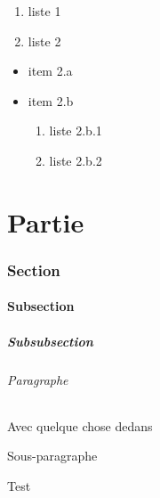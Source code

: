 \documentclass{article}
\begin{document}
			

			\begin{enumerate}
				\item liste 1
				\item liste 2
			\end{enumerate}

			\begin{itemize}[label=$\bullet$]
				\item item 2.a
				\item item 2.b
					\begin{enumerate}
						\item liste 2.b.1
						\item liste 2.b.2
					\end{enumerate}
			\end{itemize}

			

	\part{Partie}

		\section{Section}

			\subsection{Subsection}

				\subsubsection{Subsubsection}

					\paragraph{Paragraphe}%
						Avec quelque chose dedans

						\subparagraph{Sous-paragraphe}%
							Test
\end{document}
